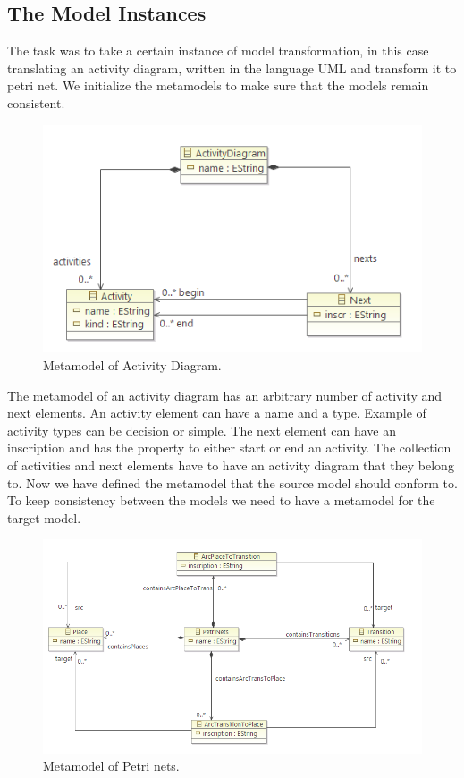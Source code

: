 \documentclass[pdftex,11pt,a4paper]{article}
\begin{document}
\subsection{The Model Instances}
\noindent The task was to take a certain instance of model transformation, in
this case translating an activity diagram, written in the language UML and
transform it to petri net. We initialize the metamodels to make sure that the
models remain consistent.

\begin{figure}[H]
	\centering
	\includegraphics[scale=0.5]{figures/ActivityMetamodel.png}
	\caption{Metamodel of Activity Diagram.}
	\label{fig:ActivityMetamodel}
\end{figure}

The metamodel of an activity diagram has an arbitrary number of activity and
next elements. An activity element can have a name and a type.
Example of activity types can be decision or simple. The next element can have
an inscription and has the property to either start or end an activity. The
collection of activities and next elements have to have an activity diagram that
they belong to. Now we have defined the metamodel that the source model should
conform to. To keep consistency between the models we need to have a
metamodel for the target model.

\begin{figure}[H]
	\centering
	\includegraphics[scale=0.5]{figures/PetriNetsMetamodel.png}
	\caption{Metamodel of Petri nets.}
	\label{fig:PetriNetsMetamodel}
\end{figure}
\end{document}
